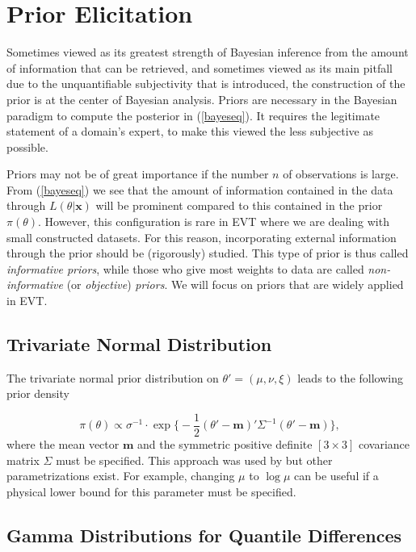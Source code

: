 \section{Prior Elicitation}\label{sec:prior}


Sometimes viewed as its greatest strength of Bayesian inference from the amount of information that can be retrieved, and sometimes viewed as its main pitfall due to the unquantifiable subjectivity that is introduced, the construction of the prior is at the center of Bayesian analysis.
Priors are necessary in the Bayesian paradigm to compute the posterior in  (\ref{bayeseq}). It requires the legitimate statement of a domain's expert, to make this viewed the less subjective as possible.

Priors may not be of great importance if the number $n$ of observations is large. From (\ref{bayeseq}) we see that the amount of information contained in the data through $L(\theta|\boldsymbol{x})$ will be prominent compared to this contained in the prior $\pi(\theta)$.
However, this configuration is rare in EVT where we are dealing with small constructed datasets. For this reason, incorporating external information through the prior should be (rigorously) studied. This type of prior is thus called \emph{informative priors}, while those who give most weights to data are called \emph{non-informative} (or \emph{objective}) \emph{priors}. We will focus on priors that are widely applied in EVT.




\subsection{Trivariate Normal Distribution}\label{sec:trivnorm}

The trivariate normal prior distribution on $\theta'=(\mu, \nu,\xi)$ leads to the following prior density 

\begin{equation}
\pi(\theta) \propto \sigma^{-1}\cdot \exp\bigg\{-\frac{1}{2}(\theta'-\boldsymbol{m})'\Sigma^{-1}(\theta'-\boldsymbol{m})\bigg\},
\end{equation}
where the mean vector $\boldsymbol{m}$ and the symmetric positive definite $[3\times 3]$ covariance matrix $\Sigma$ must be specified. This approach was used by \citet{coles_1996_bay} but other parametrizations exist. For example, changing $\mu$ to $\log \mu$ can be useful if a physical lower bound for this parameter must be specified.


\subsection{Gamma Distributions for Quantile Differences}

